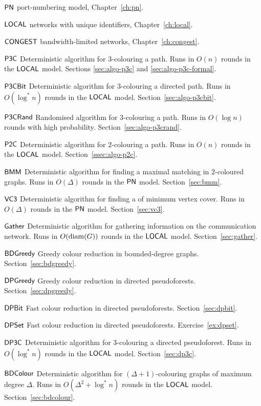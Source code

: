 
{\raggedright
\begin{notation}
    \item[$\textsf{PN}$] port-numbering model, Chapter~\ref{ch:pn}.
    \item[$\textsf{LOCAL}$] networks with unique identifiers, Chapter~\ref{ch:local}.
    \item[$\textsf{CONGEST}$] bandwidth-limited networks, Chapter~\ref{ch:congest}.
\end{notation}}


\begin{algorithms}
    \item[$\textsf{P3C}$] Deterministic algorithm for $3$-colouring a path. Runs in $O(n)$ rounds in the $\textsf{LOCAL}$ model. Sections \ref{sec:algo-p3c} and \ref{sec:algo-p3c-formal}.
    \item[$\textsf{P3CBit}$] Deterministic algorithm for $3$-colouring a directed path. Runs in $O(\log^* n)$ rounds in the $\textsf{LOCAL}$ model. Section~\ref{sec:algo-p3cbit}.
    \item[$\textsf{P3CRand}$] Randomised algorithm for $3$-colouring a path. Runs in $O(\log n)$ rounds with high probability. Section~\ref{sec:algo-p3crand}.
    \item[$\textsf{P2C}$] Deterministic algorithm for $2$-colouring a path. Runs in $O(n)$ rounds in the $\textsf{LOCAL}$ model. Section~\ref{ssec:algo-p2c}.
    \item[$\textsf{BMM}$] Deterministic algorithm for finding a maximal matching in $2$-coloured graphs. Runs in $O(\Delta)$ rounds in the $\textsf{PN}$ model. Section~\ref{sec:bmm}.
    \item[$\textsf{VC3}$] Deterministic algorithm for finding a  of minimum vertex cover. Runs in $O(\Delta)$ rounds in the $\textsf{PN}$ model. Section~\ref{sec:vc3}.
    \item[$\textsf{Gather}$] Deterministic algorithm for gathering information on the communication network. Runs in $O(\operatorname{diam}(G))$ rounds in the $\textsf{LOCAL}$ model. Section~\ref{sec:gather}.
    \item[$\textsf{BDGreedy}$] Greedy colour reduction in bounded-degree graphs. Section~\ref{sec:bdgreedy}.
    \item[$\textsf{DPGreedy}$] Greedy colour reduction in directed pseudoforests. Section~\ref{sec:dpgreedy}.
    \item[$\textsf{DPBit}$] Fast colour reduction in directed pseudoforests. Section~\ref{sec:dpbit}.
    \item[$\textsf{DPSet}$] Fast colour reduction in directed pseudoforests. Exercise~\ref{ex:dpset}.
    \item[$\textsf{DP3C}$] Deterministic algorithm for $3$-colouring a directed pseudoforest. Runs in $O(\log^* n)$ rounds in the $\textsf{LOCAL}$ model. Section~\ref{sec:dp3c}.
    \item[$\textsf{BDColour}$] Deterministic algorithm for $(\Delta+1)$-colouring graphs of maximum degree $\Delta$. Runs in $O(\Delta^2 + \log^* n)$ rounds in the $\textsf{LOCAL}$ model. Section~\ref{sec:bdcolour}.
\end{algorithms}
